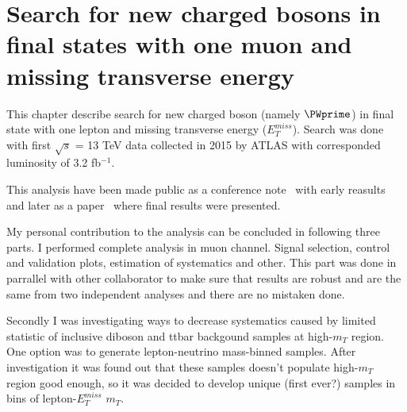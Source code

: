 

\chapter{Search for new charged bosons in final states with one muon and missing transverse energy}
\label{chap:Wprime}





This chapter describe search for new charged boson (namely $\PWprime$) in final state with one lepton and missing transverse energy ($E_T^{miss}$).
Search was done with first $\sqrt{s}$ = 13 TeV data collected in 2015 by ATLAS with corresponded luminosity of 3.2 fb$^{-1}$.

This analysis have been made public as a conference note~\cite{ATLAS-CONF-2015-063} with early reasults and later as a paper~\cite{Aaboud:2016zkn} where final results were presented.

My personal contribution to the analysis can be concluded in following three parts.
I performed complete analysis in muon channel. Signal selection, control and validation plots, estimation of systematics and other.
This part was done in parrallel with other collaborator to make sure that results are robust and are the same from two independent analyses and there are no mistaken done.

Secondly I was investigating ways to decrease systematics caused by limited statistic of inclusive diboson and ttbar backgound samples at high-$m_{T}$ region.
One option was to generate lepton-neutrino mass-binned samples. After investigation it was found out that these samples doesn't populate high-$m_{T}$ region
good enough, so it was decided to develop unique (first ever?) samples in bins of lepton-$E_T^{miss} $ $m_T$.

